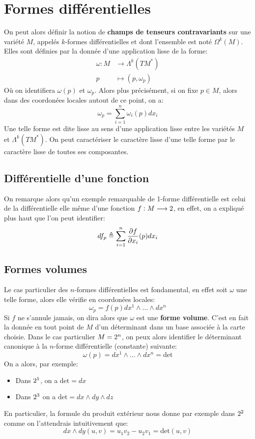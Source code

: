 \chapter{Formes différentielles}
   On peut alors définir la notion de \textbf{champs de tenseurs contravariants} sur une variété \( M \), appelés \( k \)-formes différentielles et dont l'ensemble est noté \( \Omega^k(M) \). Elles sont définies par la donnée d'une application lisse de la forme:
   \[ 
      \begin{aligned}
         \omega : M &\longrightarrow \Lambda^k(TM^*) \\
         p &\longmapsto (p, \omega_p)
      \end{aligned} 
   \]
   Où on identifiera \( \omega(p) \) et \(\omega_p\). Alors plus précisément, si on fixe \( p \in M \), alors dans des coordonées locales autout de ce point, on a:
   \[ 
      \omega_p = \sum_{i = 1}^n \omega_i(p) dx_i
   \]
   Une telle forme est dite lisse au sens d'une application lisse entre les variétés \( M \) et \( \Lambda^k(TM^*) \). On peut caractériser le caractère lisse d'une telle forme par le caractère lisse de toutes ses composantes.

   \section{Différentielle d'une fonction}
   On remarque alors qu'un exemple remarquable de 1-forme différentielle est celui de la différentielle elle même d'une fonction \( f : M \longrightarrow 2 \), en effet, on a expliqué plus haut que l'on peut identifier:
   \[ 
      df_p \triangleq \sum_{i=1}^n \frac{\partial f}{\partial x_i}(p)dx_i
   \]
   \section{Formes volumes}
      Le cas particulier des \(n\)-formes différentielles est fondamental, en effet soit \( \omega \) une telle forme, alors elle vérifie en coordonées locales:
      \[ 
         \omega_p =  f(p)dx^1 \wedge \ldots \wedge dx^n
      \]
      Si \( f \) ne s'annule jamais, on dira alors que \( \omega \) est une \textbf{forme volume}. C'est en fait la donnée en tout point de \(M\) d'un déterminant dans un base associée à la carte choisie. Dans le cas particulier \( M = 2^n \), on peux alors identifier le déterminant canonique à la \( n \)-forme différentielle (constante) suivante:
      \[ 
         \omega(p) = dx^1 \wedge \ldots \wedge dx^n = \text{det}
      \]
      On a alors, par exemple:
      \begin{itemize}
         \item Dans \(2^1\), on a \(\text{det} = dx\)
         \item Dans \(2^3\) on a \(\text{det} = dx \wedge dy \wedge dz\)
      \end{itemize}
      En particulier, la formule du produit extérieur nous donne par exemple dans \(2^2\) comme on l'attendrais intuitivement que:
      \[ 
         dx \wedge dy(u, v) = u_1v_2 - u_2v_1 = \text{det}(u, v)
      \]
